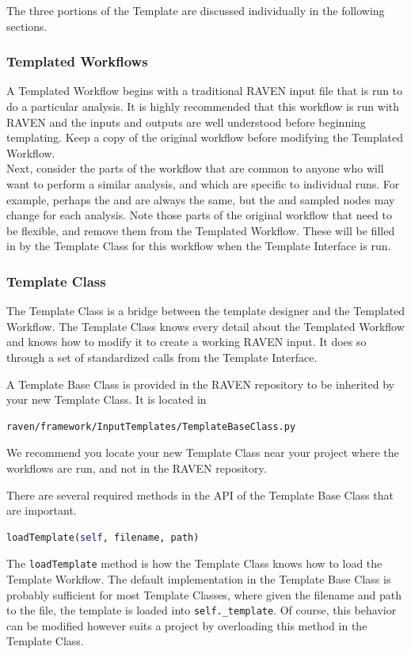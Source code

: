 The three portions of the Template are discussed individually in the following sections.

\subsubsection{Templated Workflows}
A Templated Workflow begins with a traditional RAVEN input file that is run to do a particular analysis. It is highly recommended that this workflow is run with RAVEN and the inputs and outputs are well understood before beginning templating. Keep a copy of the original workflow before modifying the Templated Workflow.
\\

Next, consider the parts of the workflow that are common to anyone who will want to perform a similar analysis, and which are specific to individual runs. For example, perhaps the  and  are always the same, but the  and sampled  nodes may change for each analysis. Note those parts of the original workflow that need to be flexible, and remove them from the Templated Workflow. These will be filled in by the Template Class for this workflow when the Template Interface is run.



\subsubsection{Template Class}
The Template Class is a bridge between the template designer and the Templated Workflow. The Template Class knows every detail about the Templated Workflow and knows how to modify it to create a working RAVEN input.  It does so through a set of standardized calls from the Template Interface.

A Template Base Class is provided in the RAVEN repository to be inherited by your new Template Class. It is located in
\begin{lstlisting}[language=bash]
 raven/framework/InputTemplates/TemplateBaseClass.py
\end{lstlisting}
We recommend you locate your new Template Class near your project where the workflows are run, and not in the RAVEN repository.

There are several required methods in the API of the Template Base Class that are important.
\begin{lstlisting}[language=python]
 loadTemplate(self, filename, path)
\end{lstlisting}
The \texttt{loadTemplate} method is how the Template Class knows how to load the Template Workflow. The default implementation in the Template Base Class is probably sufficient for most Template Classes, where given the filename and path to the file, the template is loaded into \texttt{self.\_template}. Of course, this behavior can be modified however suits a project by overloading this method in the Template Class.

